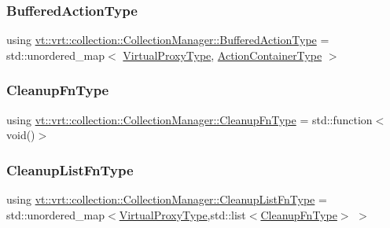 \subsubsection{\texorpdfstring{Buffered\+Action\+Type}{BufferedActionType}}
{\footnotesize\ttfamily using \hyperlink{structvt_1_1vrt_1_1collection_1_1_collection_manager_a7b32db0e6ccafa771ddd72f534a1cf8c}{vt\+::vrt\+::collection\+::\+Collection\+Manager\+::\+Buffered\+Action\+Type} =  std\+::unordered\+\_\+map$<$ \hyperlink{namespacevt_a1b417dd5d684f045bb58a0ede70045ac}{Virtual\+Proxy\+Type}, \hyperlink{structvt_1_1vrt_1_1collection_1_1_collection_manager_a536805fb5c58b557b66e7d7febe87567}{Action\+Container\+Type} $>$}

\mbox{\label{structvt_1_1vrt_1_1collection_1_1_collection_manager_a95c122e5b83bc51c306c9367b8e62c07}} 
\subsubsection{\texorpdfstring{Cleanup\+Fn\+Type}{CleanupFnType}}
{\footnotesize\ttfamily using \hyperlink{structvt_1_1vrt_1_1collection_1_1_collection_manager_a95c122e5b83bc51c306c9367b8e62c07}{vt\+::vrt\+::collection\+::\+Collection\+Manager\+::\+Cleanup\+Fn\+Type} =  std\+::function$<$void()$>$}

\mbox{\label{structvt_1_1vrt_1_1collection_1_1_collection_manager_a735e54bc5a8646536d07750e2549a156}} 
\subsubsection{\texorpdfstring{Cleanup\+List\+Fn\+Type}{CleanupListFnType}}
{\footnotesize\ttfamily using \hyperlink{structvt_1_1vrt_1_1collection_1_1_collection_manager_a735e54bc5a8646536d07750e2549a156}{vt\+::vrt\+::collection\+::\+Collection\+Manager\+::\+Cleanup\+List\+Fn\+Type} =  std\+::unordered\+\_\+map$<$\hyperlink{namespacevt_a1b417dd5d684f045bb58a0ede70045ac}{Virtual\+Proxy\+Type},std\+::list$<$\hyperlink{structvt_1_1vrt_1_1collection_1_1_collection_manager_a95c122e5b83bc51c306c9367b8e62c07}{Cleanup\+Fn\+Type}$>$ $>$}

